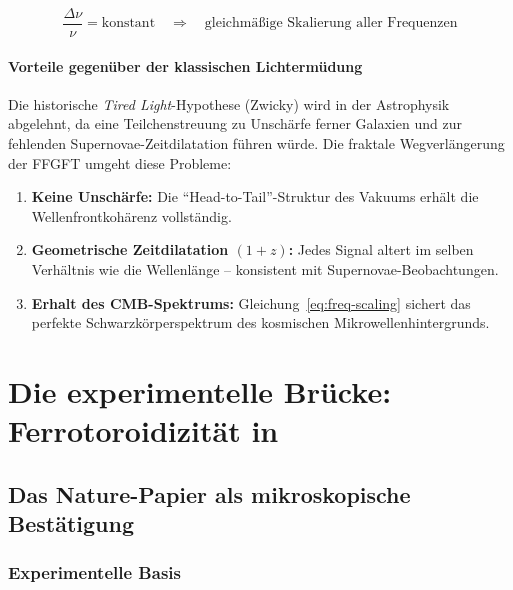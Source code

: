 \begin{equation}
\frac{\Delta\nu}{\nu} = \text{konstant} \quad
\Longrightarrow \quad
\text{gleichmäßige Skalierung aller Frequenzen}
\label{eq:freq-scaling}
\end{equation}

\subsection{Vorteile gegenüber der klassischen Lichtermüdung}

Die historische \emph{Tired Light}-Hypothese (Zwicky) wird in der Astrophysik
abgelehnt, da eine Teilchenstreuung zu Unschärfe ferner Galaxien und zur
fehlenden Supernovae-Zeitdilatation führen würde.
Die fraktale Wegverlängerung der FFGFT umgeht diese Probleme:

\begin{enumerate}
\item \textbf{Keine Unschärfe:} Die ``Head-to-Tail''-Struktur des Vakuums
  erhält die Wellenfrontkohärenz vollständig.
\item \textbf{Geometrische Zeitdilatation $(1+z)$:} Jedes Signal altert
  im selben Verhältnis wie die Wellenlänge -- konsistent mit
  Supernovae-Beobachtungen.
\item \textbf{Erhalt des CMB-Spektrums:} Gleichung~\ref{eq:freq-scaling}
  sichert das perfekte Schwarzkörperspektrum des kosmischen Mikrowellenhintergrunds.
\end{enumerate}

\part{Die experimentelle Brücke: Ferrotoroidizität in \texorpdfstring{%
      }{LiNi0.8Fe0.2PO4}}

\chapter{Das Nature-Papier als mikroskopische Bestätigung}

\section{Experimentelle Basis}

